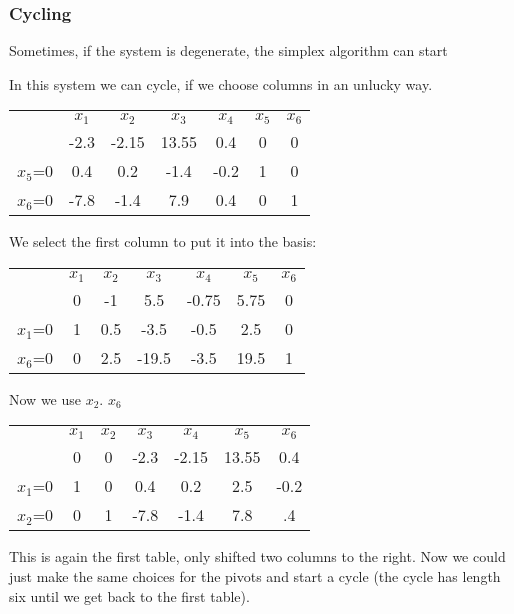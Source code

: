 \subsubsection*{Cycling}

Sometimes, if the system is degenerate, the simplex algorithm can start 

\begin{Ex}[Cycling]\label{Ex:cycling} In this system we can cycle, if we choose columns in an unlucky way.
\begin{center}
\begin{tabular}{c|cccccc}
    & $x_1$ & $x_2$ & $x_3$ & $x_4$ & $x_5$ & $x_6$\\
    & -2.3 & -2.15 & 13.55 & 0.4 & 0 & 0\\
$x_5$=0 & 0.4 & 0.2 & -1.4 & -0.2 & 1 & 0 \\
$x_6$=0 & -7.8 & -1.4 & 7.9 & 0.4 & 0 & 1\\
\end{tabular}
\end{center}

We select the first column to put it into the basis:

\begin{center}
\begin{tabular}{c|cccccc}
    & $x_1$ & $x_2$ & $x_3$ & $x_4$ & $x_5$ & $x_6$\\
    & 0 & -1 & 5.5 & -0.75 & 5.75 & 0\\
$x_1$=0 & 1 & 0.5 & -3.5 & -0.5 & 2.5 & 0 \\
$x_6$=0 & 0 & 2.5 & -19.5 & -3.5 & 19.5 & 1\\
\end{tabular}
\end{center}

Now we use $x_2$. $x_6$

\begin{center}
\begin{tabular}{c|cccccc}
    & $x_1$ & $x_2$ & $x_3$ & $x_4$ & $x_5$ & $x_6$\\
    & 0 & 0 & -2.3 & -2.15 & 13.55 & 0.4\\
$x_1$=0 & 1 & 0 & 0.4 & 0.2 & 2.5 & -0.2 \\
$x_2$=0 & 0 & 1 & -7.8 & -1.4 & 7.8 & .4\\
\end{tabular}
\end{center}

This is again the first table, only shifted two columns to the right. Now we could just make the same choices for the pivots and start a cycle (the cycle has length six until we get back to the first table).
\end{Ex}

